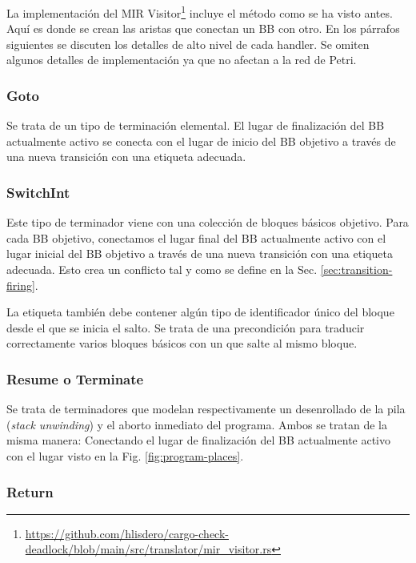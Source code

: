 La implementación del MIR Visitor\footnote{\url{https://github.com/hlisdero/cargo-check-deadlock/blob/main/src/translator/mir_visitor.rs}}
incluye el método  como se ha visto
antes. Aquí es donde se crean las aristas que conectan un \acrshort{BB} con otro.
En los párrafos siguientes se discuten los detalles de alto nivel de cada handler.
Se omiten algunos detalles de implementación ya que no afectan a la red de Petri.

\subsubsection{Goto}

Se trata de un tipo de terminación elemental.
El lugar de finalización del \acrshort{BB} actualmente
activo se conecta con el lugar de inicio del \acrshort{BB} objetivo
a través de una nueva transición con una etiqueta adecuada.

\subsubsection{SwitchInt}

Este tipo de terminador viene con una colección de bloques básicos objetivo.
Para cada \acrshort{BB} objetivo,
conectamos el lugar final del \acrshort{BB} actualmente activo
con el lugar inicial del \acrshort{BB} objetivo
a través de una nueva transición con una etiqueta adecuada.
Esto crea un conflicto tal y como se define en la Sec. \ref{sec:transition-firing}.

La etiqueta también debe contener algún tipo de identificador único del bloque desde el que se
inicia el salto. Se trata de una precondición para traducir correctamente varios bloques
básicos con un  que salte al mismo bloque.

\subsubsection{Resume o Terminate}

Se trata de terminadores que modelan respectivamente un desenrollado de la pila (\textit{stack unwinding})
y el aborto inmediato del programa.
Ambos se tratan de la misma manera: Conectando el lugar de
finalización del \acrshort{BB} actualmente activo
con el lugar  visto en la Fig. \ref{fig:program-places}.

\subsubsection{Return}

